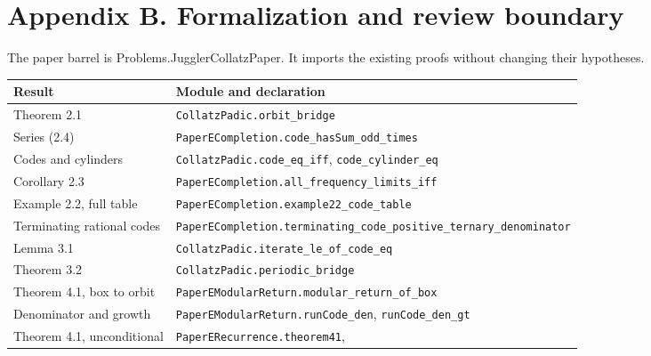 \documentclass[11pt,a4paper]{article}
\begin{document}
\clearpage

\section{Appendix B. Formalization and review
boundary}\label{appendix-b.-formalization-and-review-boundary}

The paper barrel is Problems.JugglerCollatzPaper. It imports the
existing proofs without changing their hypotheses.

\begingroup\small

\begin{longtable}[]{@{}
  >{\raggedright\arraybackslash}p{}
  >{\raggedright\arraybackslash}p{}@{}}
\toprule\noalign{}
\begin{minipage}[b]{\linewidth}\raggedright
Result
\end{minipage} & \begin{minipage}[b]{\linewidth}\raggedright
Module and declaration
\end{minipage} \\
\midrule\noalign{}
\endhead
\bottomrule\noalign{}
\endfoot
\bottomrule\noalign{}
\endlastfoot
Theorem 2.1 & \texttt{\nolinkurl{CollatzPadic.orbit_bridge}} \\
Series (2.4) &
\texttt{\nolinkurl{PaperECompletion.code_hasSum_odd_times}} \\
Codes and cylinders & \texttt{\nolinkurl{CollatzPadic.code_eq_iff}},
\texttt{\nolinkurl{code_cylinder_eq}} \\
Corollary 2.3 &
\texttt{\nolinkurl{PaperECompletion.all_frequency_limits_iff}} \\
Example 2.2, full table &
\texttt{\nolinkurl{PaperECompletion.example22_code_table}} \\
Terminating rational codes &
\texttt{\nolinkurl{PaperECompletion.terminating_code_positive_ternary_denominator}} \\
Lemma 3.1 & \texttt{\nolinkurl{CollatzPadic.iterate_le_of_code_eq}} \\
Theorem 3.2 & \texttt{\nolinkurl{CollatzPadic.periodic_bridge}} \\
Theorem 4.1, box to orbit &
\texttt{\nolinkurl{PaperEModularReturn.modular_return_of_box}} \\
Denominator and growth &
\texttt{\nolinkurl{PaperEModularReturn.runCode_den}},
\texttt{\nolinkurl{runCode_den_gt}} \\
Theorem 4.1, unconditional &
\texttt{\nolinkurl{PaperERecurrence.theorem41}},

\end{longtable}
\end{document}
